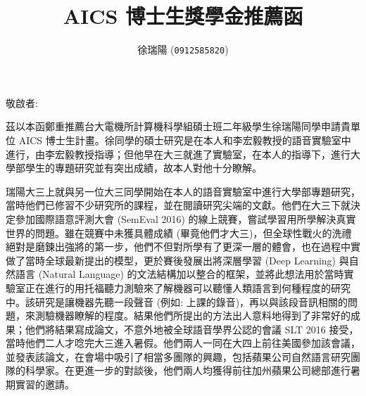 \documentclass[14pt,UTF8,fntef]{memoir}
\title{AICS 博士生獎學金推薦函}
\author{徐瑞陽 (\texttt{0912585820})}
\date{}
\begin{document}
\noindent 敬啟者:

茲以本函鄭重推薦台大電機所計算機科學組碩士班二年級學生徐瑞陽同學申請貴單位 AICS 博士生計畫。徐同學的碩士研究是在本人和李宏毅教授的語音實驗室中進行，由李宏毅教授指導；但他早在大三就進了實驗室，在本人的指導下，進行大學部學生的專題研究並有突出成績，故本人對他十分瞭解。

\vspace{1.5em}

瑞陽大三上就與另一位大三同學開始在本人的語音實驗室中進行大學部專題研究，當時他們已修習不少研究所的課程，並在閱讀研究尖端的文獻。他們在大三下就決定參加國際語意評測大會 (SemEval 2016) 的線上競賽，嘗試學習用所學解決真實世界的問題。雖在競賽中未獲具體成績 (畢竟他們才大三)，但全球性戰火的洗禮絕對是磨鍊出強將的第一步，他們不但對所學有了更深一層的體會，也在過程中實做了當時全球最新提出的模型，更於賽後發展出將深層學習 (Deep Learning) 與自然語言 (Natural Language) 的文法結構加以整合的框架，並將此想法用於當時實驗室正在進行的用托福聽力測驗來了解機器可以聽懂人類語言到何種程度的研究中。該研究是讓機器先聽一段聲音 (例如: 上課的錄音)，再以與該段音訊相關的問題，來測驗機器瞭解的程度。結果他們所提出的方法出人意料地得到了非常好的成果；他們將結果寫成論文，不意外地被全球語音學界公認的會議 SLT 2016 接受，當時他們二人才唸完大三進入暑假。他們兩人一同在大四上前往美國參加該會議，並發表該論文，在會場中吸引了相當多團隊的興趣，包括蘋果公司自然語言研究團隊的科學家。在更進一步的對談後，他們兩人均獲得前往加州蘋果公司總部進行暑期實習的邀請。


\vspace{1.5em}
\end{document}
